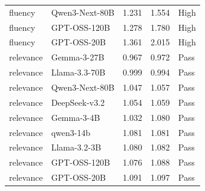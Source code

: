\begin{table}[t]
{\begin{tabular}{llrrl}
fluency & Qwen3-Next-80B & 1.231 & 1.554 & High \\
fluency & GPT-OSS-120B & 1.278 & 1.780 & High \\
fluency & GPT-OSS-20B & 1.361 & 2.015 & High \\
relevance & Gemma-3-27B & 0.967 & 0.972 & Pass \\
relevance & Llama-3.3-70B & 0.999 & 0.994 & Pass \\
relevance & Qwen3-Next-80B & 1.047 & 1.057 & Pass \\
relevance & DeepSeek-v3.2 & 1.054 & 1.059 & Pass \\
relevance & Gemma-3-4B & 1.032 & 1.080 & Pass \\
relevance & qwen3-14b & 1.081 & 1.081 & Pass \\
relevance & Llama-3.2-3B & 1.080 & 1.082 & Pass \\
relevance & GPT-OSS-120B & 1.076 & 1.088 & Pass \\
relevance & GPT-OSS-20B & 1.091 & 1.097 & Pass \\
\bottomrule
\end{tabular}
}
\end{table}